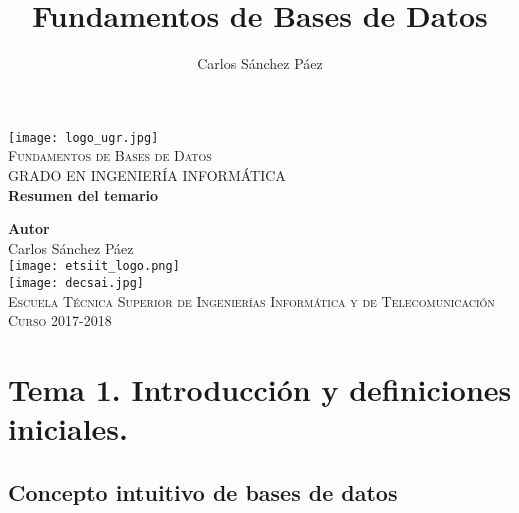 \documentclass[12pt,spanish]{article}
\title{Fundamentos de Bases de Datos}
\author{Carlos Sánchez Páez}
\numberwithin{definition}{subsection}
\begin{document}
\begin{titlepage}

\newlength{\centeroffset}
\setlength{\centeroffset}{-0.5\oddsidemargin}
\addtolength{\centeroffset}{0.5\evensidemargin}
\thispagestyle{empty}

\noindent\hspace*{\centeroffset}
\begin{minipage}{\textwidth}

\centering
\texttt{[image: logo\_ugr.jpg]}\\[1.4cm]

\textsc{ \Large Fundamentos de Bases de Datos\\[0.2cm]}
\textsc{GRADO EN INGENIERÍA INFORMÁTICA}\\[1cm]

{\Huge\bfseries Resumen del temario\\}
\end{minipage}

\vspace{1.5cm}
\noindent\hspace*{\centeroffset}
\begin{minipage}{\textwidth}
\centering

\textbf{Autor}\\ {Carlos Sánchez Páez}\\[2.5ex]
\texttt{[image: etsiit\_logo.png]}\\[0.1cm]
\vspace{1.5cm}
\texttt{[image: decsai.jpg]}\\[0.1cm]
\vspace{1cm}
\textsc{Escuela Técnica Superior de Ingenierías Informática y de Telecomunicación}\\
\vspace{1cm}
\textsc{Curso 2017-2018}
\end{minipage}
\end{titlepage}
\thispagestyle{empty}
\newpage
\tableofcontents{}
\newpage
\listoffigures
\listoftheorems
\thispagestyle{empty}
\newpage

\section{Tema 1. Introducción y definiciones iniciales.}

\subsection{Concepto intuitivo de bases de datos}
\end{document}
